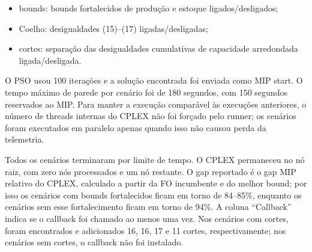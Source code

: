 \documentclass[11pt,a4paper]{article}
\begin{document}
\begin{itemize}
  \item bounds: bounds fortalecidos de produção e estoque ligados/desligados;
  \item Coelho: desigualdades (15)--(17) ligadas/desligadas;
  \item cortes: separação das desigualdades cumulativas de capacidade arredondada
  ligada/desligada.
\end{itemize}

O PSO usou 100 iterações e a solução encontrada foi enviada como MIP start. O
tempo máximo de parede por cenário foi de 180 segundos, com 150 segundos
reservados ao MIP. Para manter a execução comparável às execuções anteriores,
o número de threads internas do CPLEX não foi forçado pelo runner; os cenários
foram executados em paralelo apenas quando isso não causou perda da telemetria.

\begin{center}
\small
{}%
\end{center}

Todos os cenários terminaram por limite de tempo. O CPLEX permaneceu no nó
raiz, com zero nós processados e um nó restante. O gap reportado é o gap MIP
relativo do CPLEX, calculado a partir da FO incumbente e do melhor bound; por
isso os cenários com bounds fortalecidos ficam em torno de 84--85\%, enquanto
os cenários sem esse fortalecimento ficam em torno de 94\%. A coluna
``Callback'' indica se o callback foi chamado ao menos uma vez. Nos cenários
com cortes, foram encontrados e adicionados 16, 16, 17 e 11 cortes,
respectivamente; nos cenários sem cortes, o callback não foi instalado.
\end{document}

